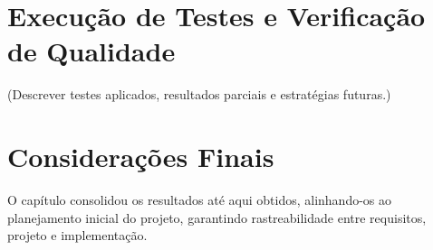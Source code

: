 \section{Execução de Testes e Verificação de Qualidade}

(Descrever testes aplicados, resultados parciais e estratégias futuras.)

\section*{Considerações Finais}

O capítulo consolidou os resultados até aqui obtidos, alinhando-os ao planejamento inicial do projeto, garantindo rastreabilidade entre requisitos, projeto e implementação.
